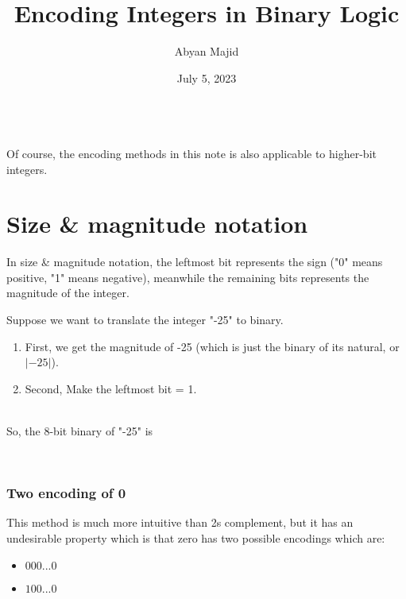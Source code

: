 \documentclass{article}
\begin{document}
\title{Encoding Integers in Binary Logic}
\author{Abyan Majid}
\date{July 5, 2023}
\maketitle

\begin{center}
     \\
    Of course, the encoding methods in this note is also applicable to higher-bit integers.
\end{center}

\section{Size \& magnitude notation}
In size \& magnitude notation, the leftmost bit represents the sign ("0" means positive, "1" means negative), meanwhile the remaining bits represents the magnitude of the integer.
\begin{center}
    \fbox{$\square$}\fbox{$\square\square\square\square\square\square\square$}
\end{center}

\begin{center}
    \noindent Suppose we want to translate the integer "-25" to binary.
\end{center}

\begin{enumerate}
    \item First, we get the magnitude of -25 (which is just the binary of its natural, or $\lvert -25 \rvert$). \\
    \fbox{$\square$}
    \item Second, Make the leftmost bit = 1. \\
     \\
\end{enumerate}

\vspace{-\baselineskip}

\begin{center}
    So, the 8-bit binary of "-25" is 
\end{center}

\noindent \hrulefill \\
\subsubsection{Two encoding of 0}
\noindent This method is much more intuitive than 2s complement, but it has an undesirable property which is that zero has two possible encodings which are:
\begin{itemize}
    \item $000...0$
    \item $100...0$
\end{itemize}
\end{document}
